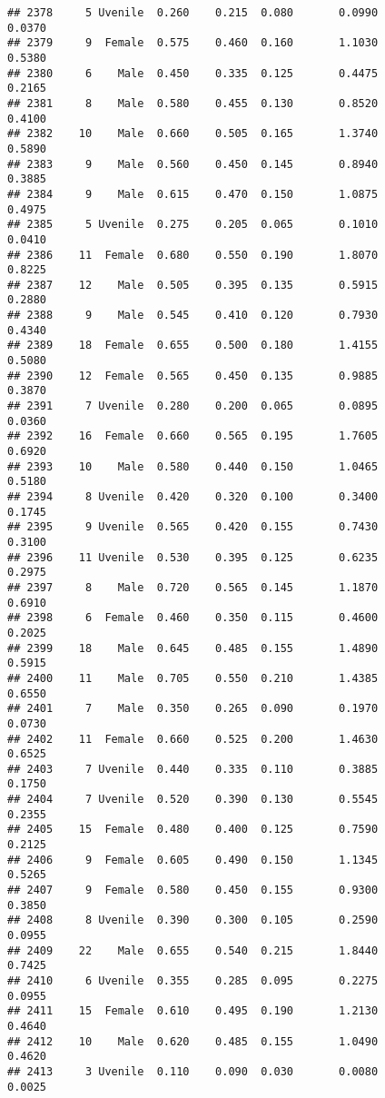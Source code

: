 \documentclass[
]{article}
\begin{document}
\begin{verbatim}
## 2378     5 Uvenile  0.260    0.215  0.080       0.0990         0.0370
## 2379     9  Female  0.575    0.460  0.160       1.1030         0.5380
## 2380     6    Male  0.450    0.335  0.125       0.4475         0.2165
## 2381     8    Male  0.580    0.455  0.130       0.8520         0.4100
## 2382    10    Male  0.660    0.505  0.165       1.3740         0.5890
## 2383     9    Male  0.560    0.450  0.145       0.8940         0.3885
## 2384     9    Male  0.615    0.470  0.150       1.0875         0.4975
## 2385     5 Uvenile  0.275    0.205  0.065       0.1010         0.0410
## 2386    11  Female  0.680    0.550  0.190       1.8070         0.8225
## 2387    12    Male  0.505    0.395  0.135       0.5915         0.2880
## 2388     9    Male  0.545    0.410  0.120       0.7930         0.4340
## 2389    18  Female  0.655    0.500  0.180       1.4155         0.5080
## 2390    12  Female  0.565    0.450  0.135       0.9885         0.3870
## 2391     7 Uvenile  0.280    0.200  0.065       0.0895         0.0360
## 2392    16  Female  0.660    0.565  0.195       1.7605         0.6920
## 2393    10    Male  0.580    0.440  0.150       1.0465         0.5180
## 2394     8 Uvenile  0.420    0.320  0.100       0.3400         0.1745
## 2395     9 Uvenile  0.565    0.420  0.155       0.7430         0.3100
## 2396    11 Uvenile  0.530    0.395  0.125       0.6235         0.2975
## 2397     8    Male  0.720    0.565  0.145       1.1870         0.6910
## 2398     6  Female  0.460    0.350  0.115       0.4600         0.2025
## 2399    18    Male  0.645    0.485  0.155       1.4890         0.5915
## 2400    11    Male  0.705    0.550  0.210       1.4385         0.6550
## 2401     7    Male  0.350    0.265  0.090       0.1970         0.0730
## 2402    11  Female  0.660    0.525  0.200       1.4630         0.6525
## 2403     7 Uvenile  0.440    0.335  0.110       0.3885         0.1750
## 2404     7 Uvenile  0.520    0.390  0.130       0.5545         0.2355
## 2405    15  Female  0.480    0.400  0.125       0.7590         0.2125
## 2406     9  Female  0.605    0.490  0.150       1.1345         0.5265
## 2407     9  Female  0.580    0.450  0.155       0.9300         0.3850
## 2408     8 Uvenile  0.390    0.300  0.105       0.2590         0.0955
## 2409    22    Male  0.655    0.540  0.215       1.8440         0.7425
## 2410     6 Uvenile  0.355    0.285  0.095       0.2275         0.0955
## 2411    15  Female  0.610    0.495  0.190       1.2130         0.4640
## 2412    10    Male  0.620    0.485  0.155       1.0490         0.4620
## 2413     3 Uvenile  0.110    0.090  0.030       0.0080         0.0025

\end{verbatim}
\end{document}
